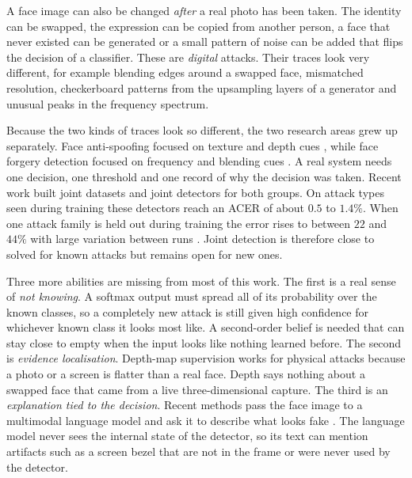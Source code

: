 \documentclass[conference]{IEEEtran}
\begin{document}
A face image can also be changed \emph{after} a real photo has been taken. The
identity can be swapped, the expression can be copied from another person, a face
that never existed can be generated or a small pattern of noise can be added that
flips the decision of a classifier. These are \emph{digital} attacks. Their traces
look very different, for example blending edges around a swapped face, mismatched
resolution, checkerboard patterns from the upsampling layers of a generator and
unusual peaks in the frequency spectrum.

Because the two kinds of traces look so different, the two research areas grew up
separately. Face anti-spoofing focused on texture and depth cues
\cite{liu2018auxiliary,yu2020cdcn,yu2021revisiting,wang2022ssan}, while face forgery
detection focused on frequency and blending cues
\cite{rossler2019ff,li2020celebdf,frank2020frequency,wang2020cnnspot}. A real system
needs one decision, one threshold and one record of why the decision was taken.
Recent work
\cite{yu2024unified,yuan2024challenge,ma2025uniattackplus,chen2025uniattack,zhang2024unidefense}
built joint datasets and joint detectors for both groups. On attack types seen during
training these detectors reach an ACER of about $0.5$ to $1.4\%$. When one attack
family is held out during training the error rises to between $22$ and $44\%$ with
large variation between runs \cite{yu2024unified}. Joint detection is therefore close
to solved for known attacks but remains open for new ones.

Three more abilities are missing from most of this work. The first is a real sense of
\emph{not knowing}. A softmax output must spread all of its probability over the known
classes, so a completely new attack is still given high confidence for whichever
known class it looks most like. A second-order belief is needed that can stay close
to empty when the input looks like nothing learned before. The second is \emph{evidence
localisation}. Depth-map supervision \cite{liu2018auxiliary,yu2021revisiting} works
for physical attacks because a photo or a screen is flatter than a real face. Depth
says nothing about a swapped face that came from a live three-dimensional capture.
The third is an \emph{explanation tied to the decision}. Recent methods pass the face
image to a multimodal language model and ask it to describe what looks fake
\cite{huang2024ffaa,guo2025m2f2det}. The language model never sees the internal state
of the detector, so its text can mention artifacts such as a screen bezel that are
not in the frame or were never used by the detector.
\end{document}
